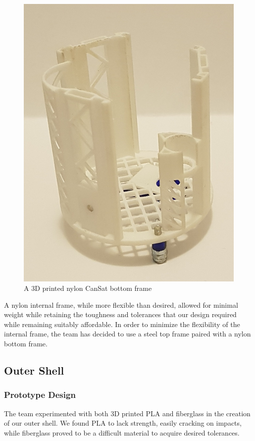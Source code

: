 \documentclass[]{report}
\begin{document}
\begin{figure}[h]
	\hfill\includegraphics[scale=0.15]{nylon_frame.jpg}\hspace*{\fill}
	\caption{A 3D printed nylon CanSat bottom frame}
	\label{nylonframe}
\end{figure}

A nylon internal frame, while more flexible than desired, allowed for minimal weight while retaining the toughness and tolerances that our design required while remaining suitably affordable. In order to minimize the flexibility of the internal frame, the team has decided to use a steel top frame paired with a nylon bottom frame.
\subsection{Outer Shell}
\subsubsection{Prototype Design}
The team experimented with both 3D printed PLA and fiberglass in the creation of our outer shell. We found PLA to lack strength, easily cracking on impacts, while fiberglass proved to be a difficult material to acquire desired tolerances.
\end{document}
